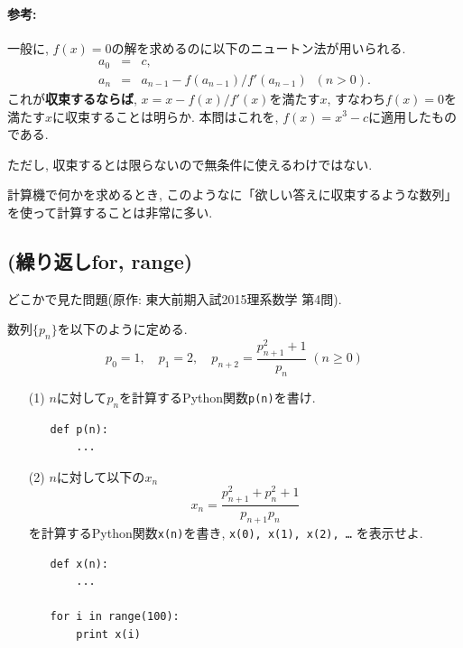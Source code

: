 \documentclass[10pt,dvipdfmx]{article}
\begin{document}
\paragraph{参考:} 一般に, $f(x) = 0$の解を求めるのに以下のニュートン法が用いられる.
\begin{eqnarray}
a_0 & = & c, \\
a_n & = & a_{n-1} - f(a_{n-1})/f'(a_{n-1}) \;\; (n > 0).
\end{eqnarray}
これが{\bf 収束するならば}, $x = x - f(x)/f'(x)$を満たす$x$,  
すなわち$f(x) = 0$を満たす$x$に収束することは明らか. 
本問はこれを, $f(x) = x^3 - c$に適用したものである.

ただし, 収束するとは限らないので無条件に使えるわけではない.

計算機で何かを求めるとき, 
このようなに「欲しい答えに収束するような数列」
を使って計算することは非常に多い.


\iffalse
\subsection{{\scriptsize (繰り返しfor, range)}}
どこかで見た問題(原作: 東大前期入試2015理系数学 第4問).

数列$\{ p_n \}$を以下のように定める.
\[ p_0 = 1, \quad  p_1 = 2, \quad p_{n+2} = \frac{p_{n+1}^2 + 1}{p_{n}} \; (n \geq 0) \]

\begin{itemize}
\item [(1)] $n$に対して$p_n$を計算するPython関数{\tt p(n)}を書け.
\begin{itemize}
\item []
\begin{lstlisting}
def p(n):
    ...  
\end{lstlisting}
\end{itemize}

\item [(2)] $n$に対して以下の$x_n$
\[ x_n = \frac{p_{n+1}^2 + p_n^2 + 1}{p_{n+1}p_n} \]
を計算するPython関数{\tt x(n)}を書き, {\tt x(0), x(1), x(2), \ldots}
を表示せよ.
\begin{itemize}
\item []
\begin{lstlisting}
def x(n):
    ...  

for i in range(100):
    print x(i)
\end{lstlisting}
\end{itemize}
\end{itemize}
\end{document}
